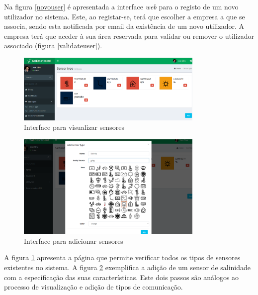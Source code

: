 Na figura \ref{novouser} é apresentada a interface \textit{web} para o registo de um novo utilizador no sistema. Este, ao registar-se, terá que escolher a empresa a que se associa, sendo esta notificada por email da existência de um novo utilizador. A empresa terá que aceder à sua área reservada para validar ou remover o utilizador associado (figura \ref{validateuser}).

\newpage

\begin{figure}[h]
	\centering

		\centering
		\includegraphics[width=0.8\textwidth]{prints-web/sensor_show.png}
		\caption{Interface para visualizar sensores}
		\label{view-sensorall}

\end{figure}



\begin{figure}[h]
		\centering
		\includegraphics[width=0.8\textwidth]{prints-web/sensor_add.png}
		\caption{ Interface para adicionar sensores}
		\label{add-sensorall}

\end{figure}


A figura \ref{view-sensorall} apresenta a página que permite verificar todos os tipos de sensores existentes no sistema. A figura \ref{add-sensorall} exemplifica a adição de um sensor de salinidade com a especificação das suas características. Este dois passos são análogos ao processo de visualização e adição de tipos de comunicação.



